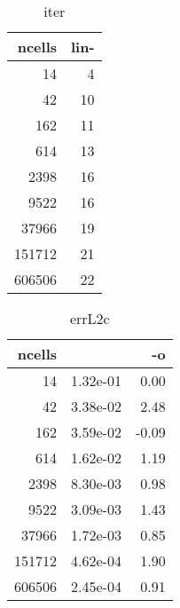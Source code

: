 \documentclass[11pt]{article}
\begin{document}
%
%
\begin{table}[!htbp]
\begin{center}
\begin{tabular}{r||r}
ncells           & lin-            \\\hline\hline
             14&              4\\\hline
             42&             10\\\hline
            162&             11\\\hline
            614&             13\\\hline
           2398&             16\\\hline
           9522&             16\\\hline
          37966&             19\\\hline
         151712&             21\\\hline
         606506&             22\\\hline
\end{tabular}
\caption{iter}
\end{center}
\label{tab:iter}
\end{table}
%
%
\begin{table}[!htbp]
\begin{center}
\begin{tabular}{r||r|r}
ncells           &                  & -o              \\\hline\hline
             14&  1.32e-01&    0.00\\\hline
             42&  3.38e-02&    2.48\\\hline
            162&  3.59e-02&   -0.09\\\hline
            614&  1.62e-02&    1.19\\\hline
           2398&  8.30e-03&    0.98\\\hline
           9522&  3.09e-03&    1.43\\\hline
          37966&  1.72e-03&    0.85\\\hline
         151712&  4.62e-04&    1.90\\\hline
         606506&  2.45e-04&    0.91\\\hline
\end{tabular}
\caption{errL2c}
\end{center}
\label{tab:errL2c}
\end{table}
%
%
\end{document}
